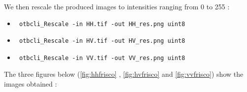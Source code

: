 We then rescale the produced images to intensities ranging from 0 to 255 :

\begin{itemize}
\item \begin{verbatim} otbcli_Rescale -in HH.tif -out HH_res.png uint8 \end{verbatim}
									  
\item \begin{verbatim} otbcli_Rescale -in HV.tif -out HV_res.png uint8 \end{verbatim}
									  
\item \begin{verbatim} otbcli_Rescale -in VV.tif -out VV_res.png uint8 \end{verbatim}
\end{itemize}

The three figures below (\ref{fig:hhfrisco} , \ref{fig:hvfrisco} and \ref{fig:vvfrisco}) show the images obtained :

